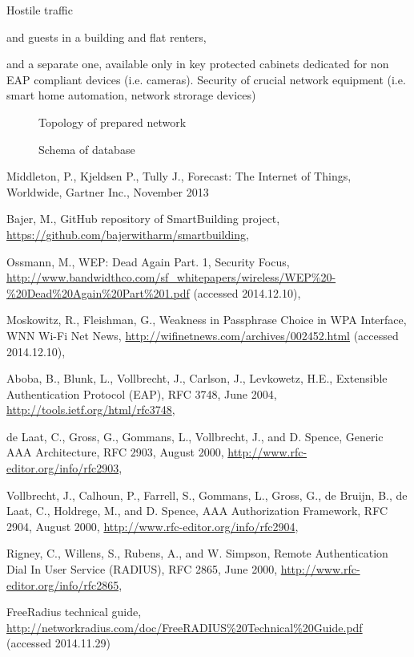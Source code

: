 \documentclass{llncs}
\begin{document}
Hostile traffic

and guests in a building and
flat renters,

 and a separate one, available only in
key protected cabinets dedicated for non EAP compliant devices (i.e. cameras).
Security of crucial network equipment (i.e. smart home automation, network
strorage devices)
 




\begin{figure}
\vspace{-15pt}
\caption{Topology of prepared network}
\end{figure}

\begin{figure}
\vspace{-15pt}
\caption{Schema of database}
\end{figure}



%
%
\begin{thebibliography}{}
%
Middleton, P., Kjeldsen P., Tully J., Forecast: The Internet of Things,
Worldwide, Gartner Inc., November 2013

Bajer, M., GitHub repository of SmartBuilding project, 
\url{https://github.com/bajerwitharm/smartbuilding},

Ossmann, M., WEP: Dead Again Part. 1, Security Focus, 
\url{http://www.bandwidthco.com/sf_whitepapers/wireless/WEP%20-%20Dead%20Again%20Part%201.pdf}
(accessed 2014.12.10),

Moskowitz, R., Fleishman, G., Weakness in Passphrase Choice in WPA Interface,
WNN Wi-Fi Net News, 
\url{http://wifinetnews.com/archives/002452.html} (accessed 2014.12.10),

Aboba, B., Blunk, L., Vollbrecht, J., Carlson, J., Levkowetz, H.E., Extensible Authentication Protocol (EAP), RFC 3748, June 2004,
\url{http://tools.ietf.org/html/rfc3748},

de Laat, C., Gross, G., Gommans, L., Vollbrecht, J., and D. Spence, Generic AAA
Architecture, RFC 2903, August 2000,
\url{http://www.rfc-editor.org/info/rfc2903},

Vollbrecht, J., Calhoun, P., Farrell, S., Gommans, L., Gross, G., de Bruijn, B.,
de Laat, C., Holdrege, M., and D. Spence, AAA Authorization Framework, RFC
2904, August 2000, \url{http://www.rfc-editor.org/info/rfc2904},

Rigney, C., Willens, S., Rubens, A., and W. Simpson, Remote  Authentication
Dial In User Service (RADIUS), RFC 2865, June 2000,
\url{http://www.rfc-editor.org/info/rfc2865},

FreeRadius technical guide,
\url{http://networkradius.com/doc/FreeRADIUS%20Technical%20Guide.pdf} (accessed 2014.11.29)

\end{thebibliography}
\end{document}
